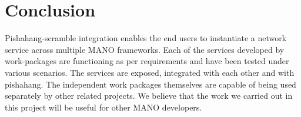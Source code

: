 \chapter{Conclusion}
\label{ch:Conclusion}

Pishahang-scramble integration enables the end users to instantiate a network service across multiple MANO frameworks. Each of the services developed by work-packages are functioning as per requirements and have been tested under various scenarios. The services are exposed, integrated with each other and with pishahang. The independent work packages themselves are capable of being used separately by other related projects. We believe that the work we carried out in this project will be useful for other MANO developers. 